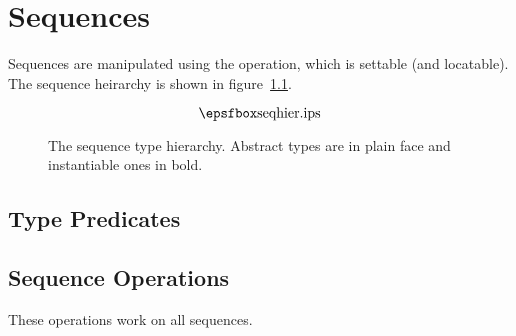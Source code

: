 %
%
%


\chapter{Sequences} \label{Sequences}

Sequences are manipulated using the  operation, which is
settable (and locatable).  The sequence heirarchy is shown in
figure~\ref{fig:seqhier}.


\begin{figure}[h]
\[ \myepsfbox{seqhier.ips} \]
\caption{The sequence type hierarchy.  Abstract types are in plain face
and instantiable ones in bold.} \label{fig:seqhier}
\end{figure}

\section{Type Predicates}



\section{Sequence Operations}

These operations work on all sequences.


